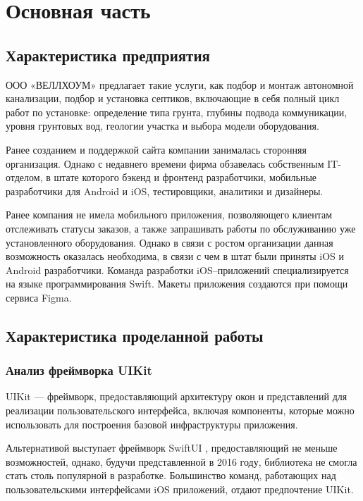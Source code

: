 \chapter{Основная часть}

\section{Характеристика предприятия}

ООО «ВЕЛЛХОУМ» предлагает такие услуги, как подбор и монтаж автономной канализации, подбор и установка септиков, включающие в себя полный цикл работ по установке: определение типа грунта, глубины подвода коммуникации, уровня грунтовых вод, геологии участка и выбора модели оборудования.

Ранее созданием и поддержкой сайта компании занималась сторонняя организация. Однако с недавнего времени фирма обзавелась собственным IT-отделом, в штате которого бэкенд и фронтенд разработчики, мобильные разработчики для Android и iOS, тестировщики, аналитики и дизайнеры.

Ранее компания не имела мобильного приложения, позволяющего клиентам отслеживать статусы заказов, а также запрашивать работы по обслуживанию уже установленного оборудования. Однако в связи с ростом организации данная возможность оказалась необходима, в связи с чем в штат были приняты iOS и Android разработчики. Команда разработки iOS--приложений специализируется на языке программирования Swift. Макеты приложения создаются при помощи сервиса Figma. 


\section{Характеристика проделанной работы}

\subsection{Анализ фреймворка UIKit}

UIKit \cite{uikit} --- фреймворк, предоставляющий архитектуру окон и представлений для реализации пользовательского интерфейса, включая компоненты, которые можно использовать для построения базовой инфраструктуры приложения. 

Альтернативой выступает фреймворк SwiftUI \cite{swiftui}, предоставляющий не меньше возможностей, однако, будучи представленной в 2016 году, библиотека не смогла стать столь популярной в разработке. Большинство команд, работающих над пользовательскими интерфейсами iOS приложений, отдают предпочтение UIKit.

